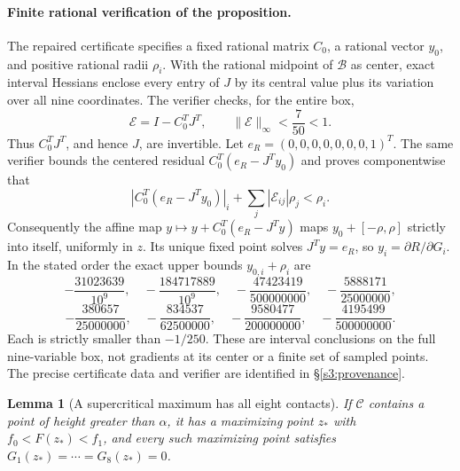 \documentclass[11pt,reqno]{amsart}
\newtheorem{lemma}[theorem]{Lemma}
\theoremstyle{definition}
\theoremstyle{remark}
\begin{document}
\paragraph{Finite rational verification of the proposition.}
The repaired certificate specifies a fixed rational matrix
\(C_0\), a rational vector \(y_0\), and positive rational radii
\(\rho_i\). With the rational midpoint of \(\mathcal B\) as
center, exact interval Hessians enclose every entry of \(J\)
by its central value plus its variation over all nine coordinates.
The verifier checks, for the entire box,
\begin{equation}\label{s3:jacobian-contraction}
 \mathcal E=I-C_0^T J^T,\qquad
 \|\mathcal E\|_\infty<\frac7{50}<1.
\end{equation}
Thus \(C_0^TJ^T\), and hence \(J\), are invertible.
Let \(e_R=(0,0,0,0,0,0,0,1)^T\). The same verifier bounds
the centered residual \(C_0^T(e_R-J^Ty_0)\) and proves
componentwise that
\[
 \left|C_0^T(e_R-J^Ty_0)\right|_i
       +\sum_j|\mathcal E_{ij}|\rho_j<\rho_i.
\]
Consequently the affine map
\(y\mapsto y+C_0^T(e_R-J^Ty)\) maps
\(y_0+[-\rho,\rho]\) strictly into itself, uniformly in \(z\).
Its unique fixed point solves \(J^Ty=e_R\), so
\(y_i=\partial R/\partial G_i\). In the stated order the exact
upper bounds \(y_{0,i}+\rho_i\) are
\[
 -\frac{31023639}{10^9},\quad
 -\frac{184717889}{10^9},\quad
 -\frac{47423419}{500000000},\quad
 -\frac{5888171}{25000000},
\]
\[
 -\frac{380657}{25000000},\quad
 -\frac{834537}{62500000},\quad
 -\frac{9580477}{200000000},\quad
 -\frac{4195499}{500000000}.
\]
Each is strictly smaller than \(-1/250\). These are interval
conclusions on the full nine-variable box, not gradients at its center
or a finite set of sampled points. The precise certificate data and
verifier are identified in \S\ref{s3:provenance}.

\begin{lemma}[A supercritical maximum has all eight contacts]
\label{s3:max-contacts}
If \(\mathcal C\) contains a point of height greater than
\(\alpha\), it has a maximizing point \(z_*\) with
\(f_0<F(z_*)<f_1\), and every such maximizing point satisfies
\(G_1(z_*)=\cdots=G_8(z_*)=0\).
\end{lemma}
\end{document}
